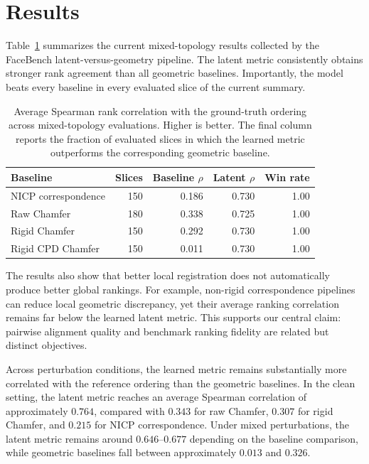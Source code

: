 \documentclass{article}
\begin{document}
\section{Results}

Table~\ref{tab:method_summary} summarizes the current mixed-topology results collected by the FaceBench latent-versus-geometry pipeline. The latent metric consistently obtains stronger rank agreement than all geometric baselines. Importantly, the model beats every baseline in every evaluated slice of the current summary.

\begin{table}[t]
    \centering
    \caption{Average Spearman rank correlation with the ground-truth ordering across mixed-topology evaluations. Higher is better. The final column reports the fraction of evaluated slices in which the learned metric outperforms the corresponding geometric baseline.}
    \label{tab:method_summary}
    \begin{tabular}{lrrrr}
        \toprule
        Baseline & Slices & Baseline $\rho$ & Latent $\rho$ & Win rate \\
        \midrule
        NICP correspondence & 150 & 0.186 & 0.730 & 1.00 \\
        Raw Chamfer & 180 & 0.338 & 0.725 & 1.00 \\
        Rigid Chamfer & 150 & 0.292 & 0.730 & 1.00 \\
        Rigid CPD Chamfer & 150 & 0.011 & 0.730 & 1.00 \\
        \bottomrule
    \end{tabular}
\end{table}

The results also show that better local registration does not automatically produce better global rankings. For example, non-rigid correspondence pipelines can reduce local geometric discrepancy, yet their average ranking correlation remains far below the learned latent metric. This supports our central claim: pairwise alignment quality and benchmark ranking fidelity are related but distinct objectives.

Across perturbation conditions, the learned metric remains substantially more correlated with the reference ordering than the geometric baselines. In the clean setting, the latent metric reaches an average Spearman correlation of approximately $0.764$, compared with $0.343$ for raw Chamfer, $0.307$ for rigid Chamfer, and $0.215$ for NICP correspondence. Under mixed perturbations, the latent metric remains around $0.646$--$0.677$ depending on the baseline comparison, while geometric baselines fall between approximately $0.013$ and $0.326$.
\end{document}
